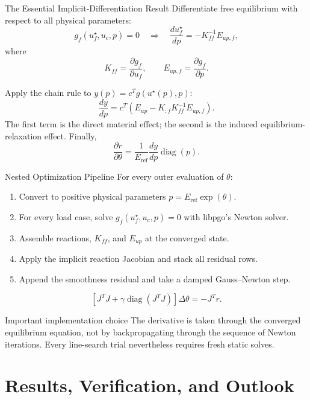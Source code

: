 \documentclass[aspectratio=169,10pt]{beamer}
\newcommand{\eref}{E_{\mathrm{ref}}}
\newcommand{\Kff}{K_{\!ff}}
\newcommand{\Eup}{E_{up}}
\newcommand{\Eupf}{E_{up,f}}
\begin{document}
\begin{frame}{The Essential Implicit-Differentiation Result}
  \small
  Differentiate free equilibrium with respect to all physical parameters:
  \[
    g_f(u_f^\star,u_c,p)=0
    \quad\Longrightarrow\quad
    \boxed{
      \frac{du_f^\star}{dp}=-\Kff^{-1}\Eupf
    },
  \]
  where
  \[
    \Kff=\frac{\partial g_f}{\partial u_f},
    \qquad
    \Eupf=\frac{\partial g_f}{\partial p}.
  \]

  Apply the chain rule to $y(p)=c^Tg(u^\star(p),p)$:
  \[
    \boxed{
      \frac{dy}{dp}
      =c^T\left(
        \Eup-K_{:f}\Kff^{-1}\Eupf
      \right)
    }.
  \]
  The first term is the direct material effect; the second is the induced
  equilibrium-relaxation effect. Finally,
  \[
    \frac{\partial r}{\partial\theta}
    =\frac1{\eref}\frac{dy}{dp}\operatorname{diag}(p).
  \]
\end{frame}

\begin{frame}{Nested Optimization Pipeline}
  \small
  For every outer evaluation of $\theta$:
  \begin{enumerate}
    \item Convert to positive physical parameters
      $p=\eref\exp(\theta)$.
    \item For every load case, solve
      $g_f(u_f^\star,u_c,p)=0$ with libpgo's Newton solver.
    \item Assemble reactions, $\Kff$, and $\Eup$ at the converged state.
    \item Apply the implicit reaction Jacobian and stack all residual rows.
    \item Append the smoothness residual and take a damped Gauss--Newton step.
  \end{enumerate}

  \[
    \left[J^TJ+\gamma\operatorname{diag}(J^TJ)\right]\Delta\theta
    =-J^Tr.
  \]

  \begin{alertblock}{Important implementation choice}
    The derivative is taken through the converged equilibrium equation, not
    by backpropagating through the sequence of Newton iterations. Every
    line-search trial nevertheless requires fresh static solves.
  \end{alertblock}
\end{frame}

\section{Results, Verification, and Outlook}
\end{document}
